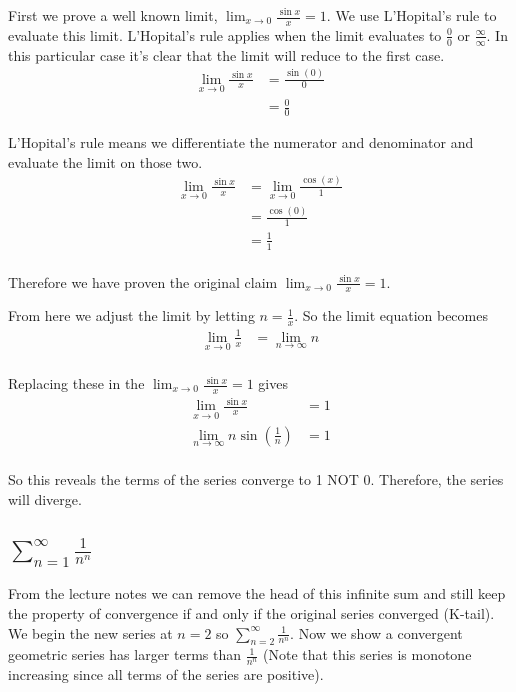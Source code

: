 \documentclass{article}
\begin{document}
First we prove a well known limit, $\lim_{x \to 0} \frac{\sin x}{x} = 1$.
We use L'Hopital's rule to evaluate this limit. L'Hopital's rule applies when
the limit evaluates to $\frac{0}{0}$ or $\frac{\infty}{\infty}$. In this 
particular case it's clear that the limit will reduce to the first case.
\begin{align*}
    \lim_{x \to 0} \frac{\sin x}{x} &= \frac{\sin(0)}{0} \\
    &= \frac{0}{0}
\end{align*}

L'Hopital's rule means we differentiate the numerator and denominator and
evaluate the limit on those two.
\begin{align*}
    \lim_{x \to 0} \frac{\sin x}{x} &= \lim_{x \to 0} \frac{\cos(x)}{1} \\
    &= \frac{\cos(0)}{1} \\
    &= \frac{1}{1} \\
\end{align*}

Therefore we have proven the original claim
$\lim_{x \to 0} \frac{\sin x}{x} = 1$.

From here we adjust the limit by letting $n = \frac{1}{x}$.
So the limit equation becomes
\begin{align*}
    \lim_{x \to 0} \frac{1}{x} &= \lim_{n \to \infty} n \\
\end{align*}

Replacing these in the $\lim_{x \to 0} \frac{\sin x}{x} = 1$ gives
\begin{align*}
    \lim_{x \to 0} \frac{\sin x}{x} &= 1 \\
    \lim_{n \to \infty} n\sin\left(\frac{1}{n}\right) &= 1 \\
\end{align*}

So this reveals the terms of the series converge to 1 NOT 0. Therefore, the
series will diverge.

\subsection{$\sum^\infty_{n=1} \frac{1}{n^n}$}
From the lecture notes we can remove the head of this infinite sum and still
keep the property of convergence if and only if the original series converged
(K-tail). We begin the new series at $n=2$ so
$\sum^\infty_{n=2} \frac{1}{n^n}$. Now we show a convergent
geometric series has larger terms than $\frac{1}{n^n}$ (Note that this series
is monotone increasing since all terms of the series are positive).
\end{document}
